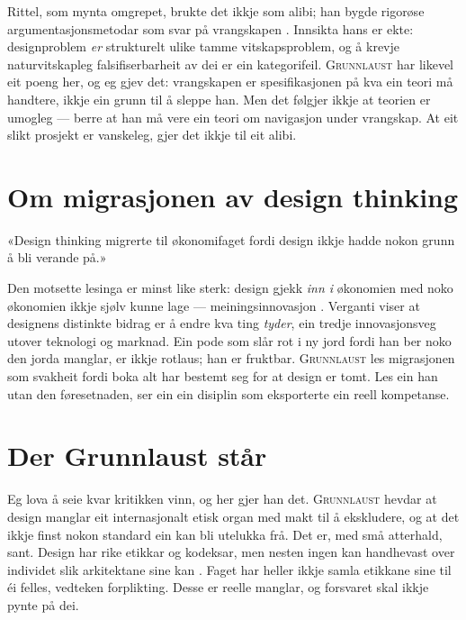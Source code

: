 \noindent Rittel, som mynta omgrepet, brukte det ikkje som alibi; han bygde rigorøse argumentasjonsmetodar som svar på vrangskapen \autocite{rittel1973}. Innsikta hans er ekte: designproblem \emph{er} strukturelt ulike tamme vitskapsproblem, og å krevje naturvitskapleg falsifiserbarheit av dei er ein kategorifeil. \textsc{Grunnlaust} har likevel eit poeng her, og eg gjev det: vrangskapen er spesifikasjonen på kva ein teori må handtere, ikkje ein grunn til å sleppe han. Men det følgjer ikkje at teorien er umogleg — berre at han må vere ein teori om navigasjon under vrangskap. At eit slikt prosjekt er vanskeleg, gjer det ikkje til eit alibi.

\section{Om migrasjonen av design thinking}

\begin{innvending}
«Design thinking migrerte til økonomifaget fordi design ikkje hadde nokon grunn å bli verande på.»
\end{innvending}

\noindent Den motsette lesinga er minst like sterk: design gjekk \emph{inn i} økonomien med noko økonomien ikkje sjølv kunne lage — meiningsinnovasjon \autocite{krippendorff2006}. Verganti viser at designens distinkte bidrag er å endre kva ting \emph{tyder}, ein tredje innovasjonsveg utover teknologi og marknad. Ein pode som slår rot i ny jord fordi han ber noko den jorda manglar, er ikkje rotlaus; han er fruktbar. \textsc{Grunnlaust} les migrasjonen som svakheit fordi boka alt har bestemt seg for at design er tomt. Les ein han utan den føresetnaden, ser ein ein disiplin som eksporterte ein reell kompetanse.

\section{Der Grunnlaust står}

Eg lova å seie kvar kritikken vinn, og her gjer han det. \textsc{Grunnlaust} hevdar at design manglar eit internasjonalt etisk organ med makt til å ekskludere, og at det ikkje finst nokon standard ein kan bli utelukka frå. Det er, med små atterhald, sant. Design har rike etikkar og kodeksar, men nesten ingen kan handhevast over individet slik arkitektane sine kan \autocite{riba2019code}. Faget har heller ikkje samla etikkane sine til éi felles, vedteken forplikting. Desse er reelle manglar, og forsvaret skal ikkje pynte på dei.

